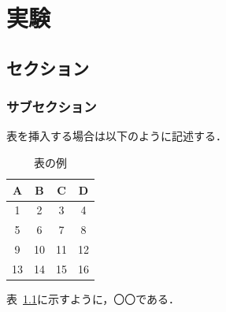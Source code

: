 \chapter{実験}

\section{セクション}

\subsection{サブセクション}

表を挿入する場合は以下のように記述する．

\begin{table}[ht]
  \centering
  \small
  \caption{表の例}
  \begin{tabular}{c|c|c|c}
    \hline
    A & B & C & D \\
    \hline
    1 & 2  & 3  & 4  \\
    5 & 6  & 7  & 8  \\
    9 & 10 & 11 & 12 \\
    13 & 14 & 15 & 16 \\
    \hline
  \end{tabular}
  \label{tab:example}
\end{table}

表~\ref{tab:example}に示すように，〇〇である．
